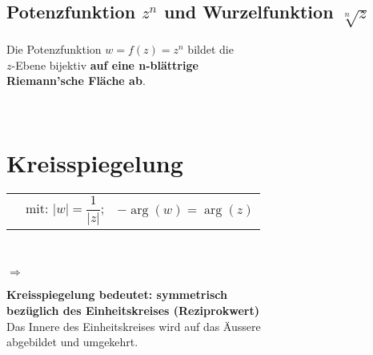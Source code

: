	\subsection{Potenzfunktion $z^n$ und Wurzelfunktion $\sqrt[n]{z}$}
		\begin{minipage}[t]{0.5\textwidth}
			\begin{framed}
				Die Potenzfunktion $w = f\left( z \right) = z^n$ bildet die\\[3pt]
				$z$-Ebene bijektiv \textbf{auf eine n-blättrige\\[3pt] Riemann'sche Fläche ab}.
			\end{framed}
		\end{minipage}
		\begin{minipage}[t]{0.5\textwidth}
			
		\end{minipage}\\[3pt]
\section{Kreisspiegelung}
	\begin{minipage}[t]{0.5\textwidth}
		\begin{tabular}{lll}
			\fbox{$w = \overline{f}\left( z \right) = \dfrac{1}{\overline{z}}$} &
			mit: $|w| = \dfrac{1}{\left| z \right|}$; &
			$-\operatorname{arg}\left( w \right) = \operatorname{arg}\left( z \right)$\\[3pt]
		\end{tabular}
	\end{minipage}
	\begin{minipage}[t]{0.5\textwidth}
		
	\end{minipage}\\[3pt]
	\begin{minipage}[t]{0.05\textwidth}
		\vspace{17pt}
		$\Rightarrow$ 
	\end{minipage}
	\begin{minipage}[t]{0.55\textwidth}
		\textbf{Kreisspiegelung bedeutet: symmetrisch}\\[3pt]
		\textbf{bezüglich des Einheitskreises (Reziprokwert)}\\[3pt]
		Das Innere des Einheitskreises wird auf das Äussere\\[3pt]
		abgebildet und umgekehrt.
	\end{minipage}
	\begin{minipage}[t]{0.4\textwidth}
		
	\end{minipage}\\[3pt]

